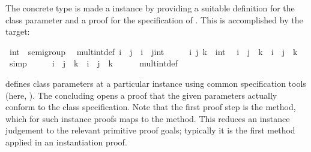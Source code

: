 \begin{isabellebody}
\begin{isamarkuptext}
\end{isamarkuptext}%
\isamarkuptrue%
%
\isamarkuptrue%
%
\begin{isamarkuptext}%
The concrete type  is made a 
  instance by providing a suitable definition for the class parameter
  \isa{{\isacharparenleft}{\isasymotimes}{\isacharparenright}} and a proof for the specification of \hyperlink{fact.assoc}{\mbox{}}.
  This is accomplished by the \hyperlink{command.instantiation}{\mbox{}} target:%
\end{isamarkuptext}%
\isamarkuptrue%
%
\isadelimquote
%
\endisadelimquote
%
\isatagquote
{}\isamarkupfalse%
\ int\ {\isacharcolon}{\isacharcolon}\ semigroup\isanewline
{}\isanewline
\isanewline
{}\isamarkupfalse%
\isanewline
\ \ mult{\isacharunderscore}int{\isacharunderscore}def{\isacharcolon}\ {\isachardoublequoteopen}i\ {\isasymotimes}\ j\ {\isacharequal}\ i\ {\isacharplus}\ {\isacharparenleft}j{\isasymColon}int{\isacharparenright}{\isachardoublequoteclose}\isanewline
\isanewline
{}\isamarkupfalse%
\ \isamarkupfalse%
\isanewline
\ \ \isamarkupfalse%
\ i\ j\ k\ {\isacharcolon}{\isacharcolon}\ int\ \isamarkupfalse%
\ {\isachardoublequoteopen}{\isacharparenleft}i\ {\isacharplus}\ j{\isacharparenright}\ {\isacharplus}\ k\ {\isacharequal}\ i\ {\isacharplus}\ {\isacharparenleft}j\ {\isacharplus}\ k{\isacharparenright}{\isachardoublequoteclose}\ \isamarkupfalse%
\ simp\isanewline
\ \ \isamarkupfalse%
\ \isamarkupfalse%
\ {\isachardoublequoteopen}{\isacharparenleft}i\ {\isasymotimes}\ j{\isacharparenright}\ {\isasymotimes}\ k\ {\isacharequal}\ i\ {\isasymotimes}\ {\isacharparenleft}j\ {\isasymotimes}\ k{\isacharparenright}{\isachardoublequoteclose}\isanewline
\ \ \ \ \isamarkupfalse%
\ mult{\isacharunderscore}int{\isacharunderscore}def\ \isacommand{{\isachardot}}\isamarkupfalse%
\isanewline
{}\isamarkupfalse%
\isanewline
\isanewline
{}\isamarkupfalse%
%
\endisatagquote
{\isafoldquote}%
%
\isadelimquote
%
\endisadelimquote
%
\begin{isamarkuptext}%
\noindent \hyperlink{command.instantiation}{\mbox{}} defines class parameters
  at a particular instance using common specification tools (here,
  \hyperlink{command.definition}{\mbox{}}).  The concluding \hyperlink{command.instance}{\mbox{}}
  opens a proof that the given parameters actually conform
  to the class specification.  Note that the first proof step
  is the \hyperlink{method.default}{\mbox{}} method,
  which for such instance proofs maps to the \hyperlink{method.intro-classes}{\mbox{}} method.
  This reduces an instance judgement to the relevant primitive
  proof goals; typically it is the first method applied
  in an instantiation proof.


\end{isamarkuptext}
\end{isabellebody}
